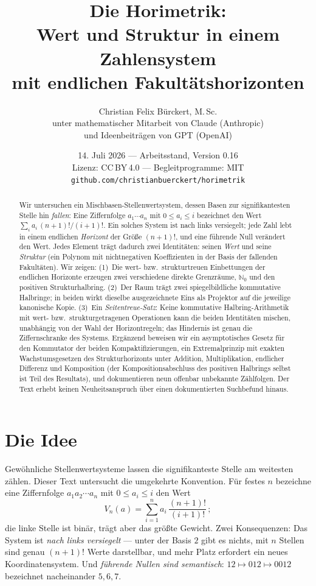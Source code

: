 \documentclass[11pt]{article}
\title{Die Horimetrik:\\
Wert und Struktur in einem Zahlensystem\\
mit endlichen Fakultätshorizonten}
\author{Christian Felix Bürckert, M.\,Sc.\\[2pt]
\normalsize unter mathematischer Mitarbeit von Claude (Anthropic)\\
\normalsize und Ideenbeiträgen von GPT (OpenAI)}
\date{14. Juli 2026 --- Arbeitsstand, Version 0.16\\[4pt]
\normalsize Lizenz: CC\,BY\,4.0 --- Begleitprogramme: MIT\\
\normalsize\texttt{github.com/christianbuerckert/horimetrik}}
\theoremstyle{definition}
\theoremstyle{remark}
\newcommand{\NN}{\mathbb N_0}
\begin{document}
\maketitle

\begin{abstract}
Wir untersuchen ein Mischbasen-Stellenwertsystem, dessen Basen zur
signifikantesten Stelle hin \emph{fallen}: Eine Ziffernfolge
$a_1\cdots a_n$ mit $0\le a_i\le i$ bezeichnet den Wert
$\sum_i a_i\,(n+1)!/(i+1)!$. Ein solches System ist nach links
versiegelt; jede Zahl lebt in einem endlichen \emph{Horizont} der
Größe $(n+1)!$, und eine führende Null verändert den Wert. Jedes
Element trägt dadurch zwei Identitäten: seinen \emph{Wert} und seine
\emph{Struktur} (ein Polynom mit nichtnegativen Koeffizienten in der
Basis der fallenden Fakultäten). Wir zeigen: (1)~Die wert- bzw.\
strukturtreuen Einbettungen der endlichen Horizonte erzeugen zwei
verschiedene direkte Grenzräume, $\NN$ und den positiven
Strukturhalbring. (2)~Der Raum trägt zwei spiegelbildliche
kommutative Halbringe; in beiden wirkt dieselbe ausgezeichnete Eins
als Projektor auf die jeweilige kanonische Kopie. (3)~Ein
\emph{Seitentreue-Satz}: Keine kommutative Halbring-Arithmetik mit
wert- bzw.\ strukturgetragenen Operationen kann die beiden
Identitäten mischen, unabhängig von der Wahl der Horizontregeln;
das Hindernis ist genau die Ziffernschranke des Systems. Ergänzend
beweisen wir ein asymptotisches Gesetz für den Kommutator der beiden
Kompaktifizierungen, ein Extremalprinzip mit exakten
Wachstumsgesetzen des Strukturhorizonts unter Addition,
Multiplikation, endlicher Differenz und Komposition (der
Kompositionsabschluss des positiven Halbrings selbst ist Teil des
Resultats), und dokumentieren neun offenbar unbekannte Zählfolgen. Der Text erhebt keinen Neuheitsanspruch über einen
dokumentierten Suchbefund hinaus.
\end{abstract}

\section{Die Idee}

Gewöhnliche Stellenwertsysteme lassen die signifikanteste Stelle am
weitesten zählen. Dieser Text untersucht die umgekehrte Konvention.
Für festes $n$ bezeichne eine Ziffernfolge $a_1a_2\cdots a_n$ mit
$0\le a_i\le i$ den Wert
\[
V_n(a)=\sum_{i=1}^n a_i\,\frac{(n+1)!}{(i+1)!}\,;
\]
die linke Stelle ist binär, trägt aber das größte Gewicht. Zwei
Konsequenzen: Das System ist \emph{nach links versiegelt} --- unter
der Basis $2$ gibt es nichts, mit $n$ Stellen sind genau $(n+1)!$
Werte darstellbar, und mehr Platz erfordert ein neues
Koordinatensystem. Und \emph{führende Nullen sind semantisch}:
$12\mapsto012\mapsto0012$ bezeichnet nacheinander $5,6,7$.
\end{document}
